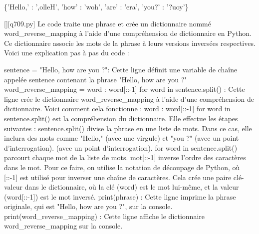 \{'Hello,' : ',olleH', 'how' : 'woh', 'are' : 'era', 'you?' : '?uoy'\}
        \par
        \begin{solution}
            \renewcommand{\nomfichier}{q709.py}
            \pythonfile{\chemincode \nomfichier}[][\nomfichier]
            Le code traite une phrase et crée un dictionnaire nommé word_reverse_mapping à l'aide d'une compréhension de dictionnaire en Python. Ce dictionnaire associe les mots de la phrase à leurs versions inversées respectives. Voici une explication pas à pas du code :

    sentence = "Hello, how are you ?": Cette ligne définit une variable de chaîne appelée sentence contenant la phrase "Hello, how are you ?"
    word_reverse_mapping = {word : word[::-1] for word in sentence.split()} : Cette ligne crée le dictionnaire word_reverse_mapping à l'aide d'une compréhension de dictionnaire. Voici comment cela fonctionne :
        {word : word[::-1] for word in sentence.split()} est la compréhension du dictionnaire. Elle effectue les étapes suivantes :
        sentence.split() divise la phrase en une liste de mots. Dans ce cas, elle inclura des mots comme "Hello," (avec une virgule) et "you ?" (avec un point d'interrogation). (avec un point d'interrogation).
        for word in sentence.split() parcourt chaque mot de la liste de mots.
        mot[::-1] inverse l'ordre des caractères dans le mot. Pour ce faire, on utilise la notation de découpage de Python, où [::-1] est utilisé pour inverser une chaîne de caractères.
        Cela crée une paire clé-valeur dans le dictionnaire, où la clé (word) est le mot lui-même, et la valeur (word[::-1]) est le mot inversé.
    print(phrase) : Cette ligne imprime la phrase originale, qui est "Hello, how are you ?", sur la console.
    print(word_reverse_mapping) : Cette ligne affiche le dictionnaire word_reverse_mapping sur la console.
        \end{solution}
        
